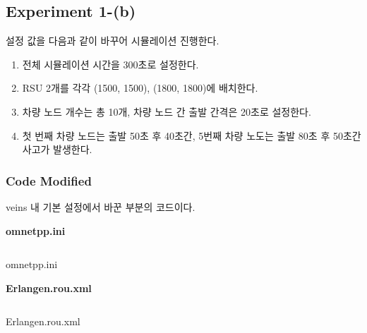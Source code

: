 
    \subsection*{Experiment 1-(b)}
        설정 값을 다음과 같이 바꾸어 시뮬레이션 진행한다.
        \begin{enumerate}
            \item 전체 시뮬레이션 시간을 300초로 설정한다.    \vspace{-1mm}
            \item RSU 2개를 각각 (1500, 1500), (1800, 1800)에 배치한다. \vspace{-1mm}
            \item 차량 노드 개수는 총 10개, 차량 노드 간 출발 간격은 20초로 설정한다. \vspace{-1mm}
            \item 첫 번째 차량 노드는 출발 50초 후 40초간, 5번째 차량 노도는 출발 80초 후 50초간 사고가 발생한다. \vspace{-1mm}
        \end{enumerate}
        
        \subsubsection*{Code Modified}
            veins 내 기본 설정에서 바꾼 부분의 코드이다.
            
            \textbf{omnetpp.ini}
            
            \vspace{-2mm}
            \begin{listing}[h!]
                \inputminted[framerule = 1pt,framesep = 2mm , frame = lines, fontsize=\scriptsize]{c}{./code/week13/omnetpp.cpp}
                \vspace{-3mm}
                \caption{\footnotesize omnetpp.ini}
                \vspace{-3mm}
            \end{listing}
            \vspace{-6mm}
            
            \textbf{Erlangen.rou.xml}
            
            \vspace{-2mm}
            \begin{listing}[h!]
                \inputminted[framerule = 1pt,framesep = 2mm , frame = lines, fontsize=\scriptsize]{c}{./code/week13/Erlangen.cpp}
                \vspace{-3mm}
                \caption{\footnotesize Erlangen.rou.xml}
                \vspace{-3mm}
            \end{listing}
            \vspace{-6mm}
            
